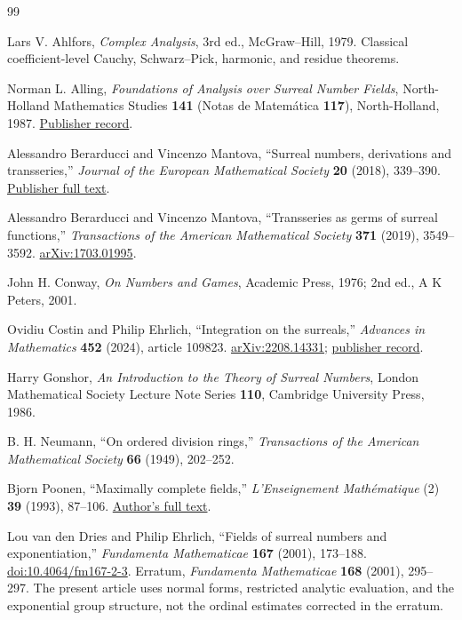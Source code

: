 \documentclass[11pt,letterpaper]{article}
\theoremstyle{definition}
\theoremstyle{remark}
\numberwithin{equation}{section}
\begin{document}
\begin{thebibliography}{99}

Lars V. Ahlfors,
\emph{Complex Analysis}, 3rd ed., McGraw--Hill, 1979.
Classical coefficient-level Cauchy, Schwarz--Pick, harmonic, and residue theorems.

Norman L. Alling,
\emph{Foundations of Analysis over Surreal Number Fields},
North-Holland Mathematics Studies \textbf{141} (Notas de Matem\'atica \textbf{117}), North-Holland, 1987.
\href{https://shop.elsevier.com/books/foundations-of-analysis-over-surreal-number-fields/alling/978-0-444-70226-5}{Publisher record}.

Alessandro Berarducci and Vincenzo Mantova,
``Surreal numbers, derivations and transseries,''
\emph{Journal of the European Mathematical Society} \textbf{20} (2018), 339--390.
\href{https://ems.press/content/serial-article-files/32275}{Publisher full text}.

Alessandro Berarducci and Vincenzo Mantova,
``Transseries as germs of surreal functions,''
\emph{Transactions of the American Mathematical Society} \textbf{371} (2019), 3549--3592.
\href{https://arxiv.org/abs/1703.01995}{arXiv:1703.01995}.

John H. Conway,
\emph{On Numbers and Games}, Academic Press, 1976; 2nd ed., A K Peters, 2001.

Ovidiu Costin and Philip Ehrlich,
``Integration on the surreals,''
\emph{Advances in Mathematics} \textbf{452} (2024), article 109823.
\href{https://arxiv.org/abs/2208.14331}{arXiv:2208.14331};
\href{https://www.sciencedirect.com/science/article/pii/S0001870824003384}{publisher record}.

Harry Gonshor,
\emph{An Introduction to the Theory of Surreal Numbers},
London Mathematical Society Lecture Note Series \textbf{110}, Cambridge University Press, 1986.

B. H. Neumann,
``On ordered division rings,''
\emph{Transactions of the American Mathematical Society} \textbf{66} (1949), 202--252.

Bjorn Poonen,
``Maximally complete fields,''
\emph{L'Enseignement Math\'ematique} (2) \textbf{39} (1993), 87--106.
\href{https://math.mit.edu/~poonen/papers/amsval.pdf}{Author's full text}.

Lou van den Dries and Philip Ehrlich,
``Fields of surreal numbers and exponentiation,''
\emph{Fundamenta Mathematicae} \textbf{167} (2001), 173--188.
\href{https://doi.org/10.4064/fm167-2-3}{doi:10.4064/fm167-2-3}.
Erratum, \emph{Fundamenta Mathematicae} \textbf{168} (2001), 295--297.
The present article uses normal forms, restricted analytic evaluation, and the exponential group structure, not the ordinal estimates corrected in the erratum.

\end{thebibliography}
\end{document}
